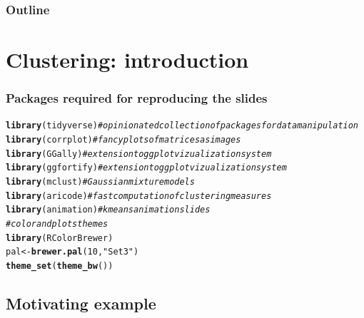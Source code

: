 \documentclass{beamer}\usepackage[]{graphicx}\usepackage[]{color}
\makeatletter
\newcommand{\hlnum}[1]{\textcolor[rgb]{0.686,0.059,0.569}{#1}}%
\newcommand{\hlstr}[1]{\textcolor[rgb]{0.192,0.494,0.8}{#1}}%
\newcommand{\hlcom}[1]{\textcolor[rgb]{0.678,0.584,0.686}{\textit{#1}}}%
\newcommand{\hlstd}[1]{\textcolor[rgb]{0.345,0.345,0.345}{#1}}%
\newcommand{\hlkwb}[1]{\textcolor[rgb]{0.69,0.353,0.396}{#1}}%
\newcommand{\hlkwd}[1]{\textcolor[rgb]{0.737,0.353,0.396}{\textbf{#1}}}%
\newenvironment{kframe}{%
 \def\at@end@of@kframe{}%
 \ifinner\ifhmode%
  \def\at@end@of@kframe{\end{minipage}}%
  \begin{minipage}{\columnwidth}%
 \fi\fi%
 \def\FrameCommand##1{\hskip\@totalleftmargin \hskip-\fboxsep
 \colorbox{shadecolor}{##1}\hskip-\fboxsep
     \hskip-\linewidth \hskip-\@totalleftmargin \hskip\columnwidth}%
 \MakeFramed {\advance\hsize-\width
   \@totalleftmargin\z@ \linewidth\hsize
   \@setminipage}}%
 {\par\unskip\endMakeFramed%
 \at@end@of@kframe}
\newenvironment{knitrout}{}{} %
\makeatother
\begin{document}
\begin{frame}
  \frametitle{Outline}
  \tableofcontents
\end{frame}

\section{Clustering: introduction}

\begin{frame}[fragile]
  \frametitle{Packages required for reproducing the slides}
  
\begin{knitrout}\scriptsize
{}\color{fgcolor}\begin{kframe}
\begin{alltt}
\hlkwd{library}\hlstd{(tidyverse)}  \hlcom{# opinionated collection of packages for data manipulation}
\hlkwd{library}\hlstd{(corrplot)}   \hlcom{# fancy plots of matrices as images}
\hlkwd{library}\hlstd{(GGally)}     \hlcom{# extension to ggplot vizualization system}
\hlkwd{library}\hlstd{(ggfortify)}  \hlcom{# extension to ggplot vizualization system}
\hlkwd{library}\hlstd{(mclust)}     \hlcom{# Gaussian mixture models}
\hlkwd{library}\hlstd{(aricode)}    \hlcom{# fast computation of clustering measures}
\hlkwd{library}\hlstd{(animation)}  \hlcom{# kmeans animation slides}
\hlcom{# color and plots themes}
\hlkwd{library}\hlstd{(RColorBrewer)}
\hlstd{pal} \hlkwb{<-} \hlkwd{brewer.pal}\hlstd{(}\hlnum{10}\hlstd{,} \hlstr{"Set3"}\hlstd{)}
\hlkwd{theme_set}\hlstd{(}\hlkwd{theme_bw}\hlstd{())}
\end{alltt}
\end{kframe}
\end{knitrout}
  
\end{frame}

\subsection{Motivating example}
\end{document}
